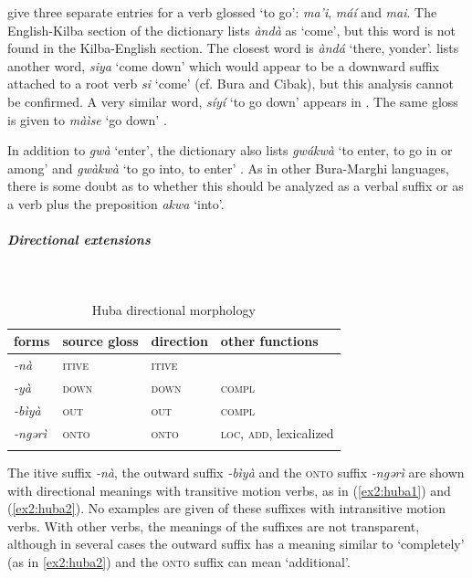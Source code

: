 \citet[40--41]{muazuModernKilbaDictionary2015} give three separate entries for a verb glossed `to go': \textit{ma'i}, \textit{máí} and \textit{mai}. The English-Kilba section of the dictionary lists \textit{àndà} as `come', but this word is not found in the Kilba-English section. The closest word is \textit{àndá} `there, yonder'. \citet[24]{muazuGrammarKilbaLanguage2009} lists another word, \textit{siya} `come down' which would appear to be a downward suffix attached to a root verb \textit{si} `come' (cf. Bura and Cibak), but this analysis cannot be confirmed. A very similar word, \textit{síyí} `to go down' appears in \citet[61]{muazuModernKilbaDictionary2015}. The same gloss is given to \textit{màìse} `go down' \citep[81]{muazuModernKilbaDictionary2015}. 

In addition to \textit{gwà} `enter', the dictionary also lists \textit{gwákwà} `to enter, to go in or among' and \textit{gwàkwà} `to go into, to enter' \citep[25, 80]{muazuModernKilbaDictionary2015}. As in other Bura-Marghi languages, there is some doubt as to whether this should be analyzed as a verbal suffix or as a verb plus the preposition \textit{akwa} `into'. 

\newpage
\subparagraph{Directional extensions}~

\begin{table}[H]
	\caption{Huba directional morphology}
	\label{tab:huba}
	\begin{tabular}{llll} %
		\lsptoprule
		forms & source gloss & direction  & other functions  \\ %
		\midrule
		\textit{-nà}  &  \textsc{itive}  &  \textsc{itive} &     \\
		\textit{-yà}  &  \textsc{down}  &   \textsc{down}  &  \textsc{compl}   \\
		\textit{-bìyà}  &  \textsc{out}  &  \textsc{out}   & \textsc{compl} \\
		\textit{-ngərì}  &  \textsc{onto}  &   \textsc{onto}   &  \textsc{loc, add}, lexicalized \\		
		\lspbottomrule
	\end{tabular}
\end{table} 

The itive suffix \textit{-nà}, the outward suffix \textit{-bìyà} and the \textsc{onto} suffix \textit{-ngərì} are shown with directional meanings with transitive motion verbs, as in (\ref{ex2:huba1}) and (\ref{ex2:huba2}). No examples are given of these suffixes with intransitive motion verbs. With other verbs, the meanings of the suffixes are not transparent, although in several cases the outward suffix has a meaning similar to `completely' (as in \ref{ex2:huba2}) and the \textsc{onto} suffix can mean `additional'. 


